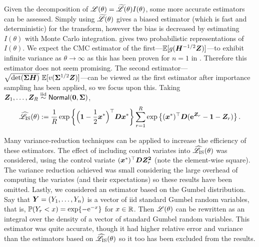 Given the decomposition of $\mathscr{L}(\theta) = \widetilde{\mathscr{L}}(\theta)
I(\theta)$, some more accurate estimators can be assessed. Simply using
$\widetilde{\mathscr{L}}(\theta)$ gives a biased estimator (which is fast and
deterministic) for the transform, however the bias is decreased by estimating
$I(\theta)$ with Monte Carlo integration.  gives
two probabilistic representations of $I(\theta)$. We expect the CMC estimator
of the first---$\operatorname{{\mathbb E}}[g(\bm{H}^{-1/2}\bm{Z})
]$---to exhibit infinite variance as $\theta \to \infty$ as this has been
proven for $n=1$ in \cite{asmussen2014laplace}. Therefore this estimator does
not seem promising. The second estimator---$\sqrt{\det(\bm{\Sigma}
  \bm{H})} \, \operatorname{{\mathbb E}}[ v(\bm{\Sigma}^{1/2} \bm{Z}) ]$---can be viewed as the first
estimator after importance sampling has been applied, so we focus upon
this. Taking $\bm{Z}_1, \dots, \bm{Z}_R \overset{\smash{\mathrm{iid}}}{\sim} \mathsf{Normal}(\bm{0}, \bm{\Sigma})$,
%
\[ \widehat{\mathscr{L}}_{\mathrm{IS}}(\theta) := \frac{1}{R}
  \exp\left\{ \Bigl(\bm{1} - \frac12 \bm{x}^* \Bigr)^\top \bm{D} \bm{x}^* \right\}
  \sum_{r=1}^R \exp\left\{ (\bm{x}^*)^\top \bm{D} (\text{\bf{e}}^{\bm{Z}_r} - \bm{1} - \bm{Z}_r)
  \right\}. \]

Many variance-reduction techniques can be applied to increase the efficiency
of these estimators. The effect of including control variates into
$\widehat{\mathscr{L}}_{\mathrm{IS}}(\theta)$ was considered, using the control
variate $(\bm{x}^*)^\top \bm{D} \bm{Z}_r^{\bm{2}}$ (note the element-wise square). The
variance reduction achieved was small considering the large overhead of
computing the variates (and their expectations) so these results have been
omitted. Lastly, we considered an estimator based on the Gumbel
distribution. Say that $\bm{Y} = (Y_1, \dots, Y_n)$ is a vector of iid standard
Gumbel random variables, that is, $\operatorname{{\mathbb P}}(Y_r < x) = \exp\{ -\mathrm{e}^{-x} \}$ for
$x \in \mathbb{R}$. Then $\mathscr{L}(\theta)$ can be rewritten as an integral over the
density of a vector of standard Gumbel random variables. This estimator was
quite accurate, though it had higher relative error and variance than the
estimators based on $\widehat{\mathscr{L}}_{\mathrm{IS}}(\theta)$ so it too has
been excluded from the results.

